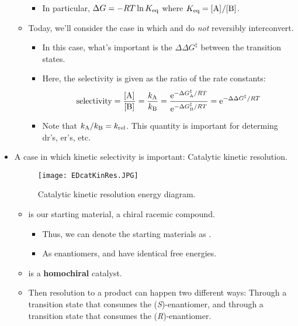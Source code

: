 \documentclass[../notes.tex]{subfiles}
\begin{document}
\begin{itemize}
\begin{itemize}
\begin{itemize}
            \item In particular, $\Delta G=-RT\ln K_\textup{eq}$ where $\Keq=\cnc{A}/\cnc{B}$.
        \end{itemize}
        \pagebreak
        \item Today, we'll consider the case in which  and  do \emph{not} reversibly interconvert.
        \begin{itemize}
            \item In this case, what's important is the $\Delta\Delta G^\ddagger$ between the transition states.
            \item Here, the selectivity is given as the ratio of the rate constants:
            \begin{equation*}
                \text{selectivity} = \frac{\cnc{A}}{\cnc{B}}
                = \frac{k_{\ce{A}}}{k_{\ce{B}}}
                = \frac{\e[-\Delta G^\ddagger_{\ce{A}}/RT]}{\e[-\Delta G^\ddagger_{\ce{B}}/RT]}
                = \e[-\Delta\Delta G^\ddagger/RT]
            \end{equation*}
            \item Note that $k_{\ce{A}}/k_{\ce{B}}=\krel$. This quantity is important for determing dr's, er's, etc.
        \end{itemize}
    \end{itemize}
    \item A case in which kinetic selectivity is important: Catalytic kinetic resolution.
    \begin{figure}[h!]
        \centering
        \texttt{[image: EDcatKinRes.JPG]}
        \caption{Catalytic kinetic resolution energy diagram.}
        \label{fig:EDcatKinRes}
    \end{figure}
    \begin{itemize}
        \item {} is our starting material, a chiral racemic compound.
        \begin{itemize}
            \item Thus, we can denote the starting materials as .
            \item As enantiomers,  and  have identical free energies.
        \end{itemize}
        \item {} is a \textbf{homochiral} catalyst.
        \item Then resolution to a product  can happen two different ways: Through a transition state that consumes the (\emph{S})-enantiomer, and through a transition state that consumes the (\emph{R})-enantiomer.

\end{itemize}
\end{itemize}
\end{document}
